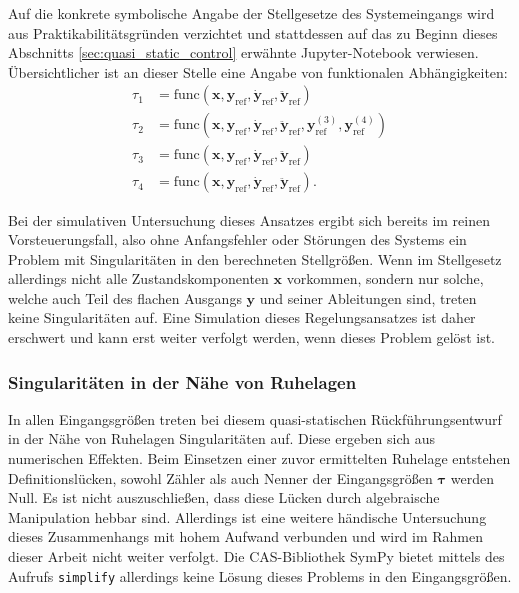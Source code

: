 Auf die konkrete symbolische Angabe der Stellgesetze des Systemeingangs wird aus Praktikabilitätsgründen verzichtet und stattdessen auf das zu Beginn dieses Abschnitts \ref{sec:quasi_static_control} erwähnte Jupyter-Notebook verwiesen. Übersichtlicher ist an dieser Stelle eine Angabe von funktionalen Abhängigkeiten:
\begin{subequations}
	\begin{align}
		\tau_1 &= \mathrm{func}(\mathbf{x}, \mathbf{y}_{\mathrm{ref}}, \dot{\mathbf{y}}_{\mathrm{ref}}, \ddot{\mathbf{y}}_{\mathrm{ref}}) \\
		\tau_2 &= \mathrm{func}(\mathbf{x}, \mathbf{y}_{\mathrm{ref}}, \dot{\mathbf{y}}_{\mathrm{ref}}, \ddot{\mathbf{y}}_{\mathrm{ref}}, \mathbf{y}_{\mathrm{ref}}^{(3)}, \mathbf{y}_{\mathrm{ref}}^{(4)}) \\
		\tau_3 &=\mathrm{func}(\mathbf{x}, \mathbf{y}_{\mathrm{ref}}, \dot{\mathbf{y}}_{\mathrm{ref}}, \ddot{\mathbf{y}}_{\mathrm{ref}}) \\
		\tau_4 &= \mathrm{func}(\mathbf{x}, \mathbf{y}_{\mathrm{ref}}, \dot{\mathbf{y}}_{\mathrm{ref}}, \ddot{\mathbf{y}}_{\mathrm{ref}}).
	\end{align}
\end{subequations}

Bei der simulativen Untersuchung dieses Ansatzes ergibt sich bereits im reinen Vorsteuerungsfall, also ohne Anfangsfehler oder Störungen des Systems ein Problem mit Singularitäten in den berechneten Stellgrößen. Wenn im Stellgesetz allerdings nicht alle Zustandskomponenten $\mathbf{x}$ vorkommen, sondern nur solche, welche auch Teil des flachen Ausgangs $\mathbf{y}$ und seiner Ableitungen sind, treten keine Singularitäten auf. Eine Simulation dieses Regelungsansatzes ist daher erschwert und kann erst weiter verfolgt werden, wenn dieses Problem gelöst ist.

\subsubsection{Singularitäten in der Nähe von Ruhelagen}
In allen Eingangsgrößen treten bei diesem quasi-statischen Rückführungsentwurf in der Nähe von Ruhelagen Singularitäten auf. Diese ergeben sich aus numerischen Effekten. Beim Einsetzen einer zuvor ermittelten Ruhelage entstehen Definitionslücken, sowohl Zähler als auch Nenner der Eingangsgrößen $\boldsymbol{\tau}$ werden Null. Es ist nicht auszuschließen, dass diese Lücken durch algebraische Manipulation hebbar sind. Allerdings ist eine weitere händische Untersuchung dieses Zusammenhangs mit hohem Aufwand verbunden und wird im Rahmen dieser Arbeit nicht weiter verfolgt. Die CAS-Bibliothek SymPy bietet mittels des Aufrufs \texttt{simplify} allerdings keine Lösung dieses Problems in den Eingangsgrößen.

